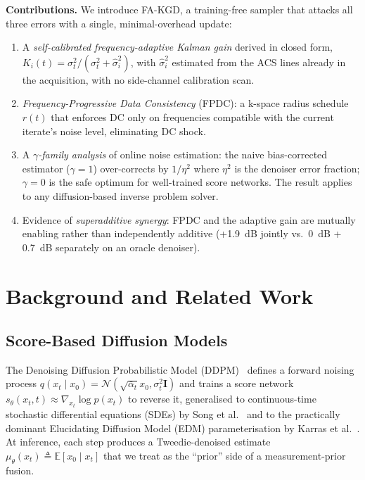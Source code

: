 \documentclass[conference]{IEEEtran}
\newcommand{\hatsig}{\hat{\sigma}}
\newcommand{\muth}{\mu_\theta}
\begin{document}
\textbf{Contributions.} We introduce FA-KGD, a training-free sampler that
attacks all three errors with a single, minimal-overhead update:
\begin{enumerate}
  \item A \emph{self-calibrated frequency-adaptive Kalman gain} derived in
  closed form, $K_i(t)=\sigma_t^2/(\sigma_t^2+\hatsig_i^2)$, with $\hatsig_i^2$
  estimated from the ACS lines already in the acquisition, with no side-channel
  calibration scan.
  \item \emph{Frequency-Progressive Data Consistency} (FPDC): a k-space
  radius schedule $r(t)$ that enforces DC only on frequencies compatible with
  the current iterate's noise level, eliminating DC shock.
  \item A \emph{$\gamma$-family analysis} of online noise estimation: the
  naive bias-corrected estimator ($\gamma{=}1$) over-corrects by $1/\eta^2$
  where $\eta^2$ is the denoiser error fraction; $\gamma{=}0$ is the safe
  optimum for well-trained score networks. The result applies to any
  diffusion-based inverse problem solver.
  \item Evidence of \emph{superadditive synergy}: FPDC and the adaptive gain
  are mutually enabling rather than independently additive (+1.9~dB jointly
  vs.~0~dB + 0.7~dB separately on an oracle denoiser).
\end{enumerate}

\section{Background and Related Work}
\label{sec:related}

\subsection{Score-Based Diffusion Models}

The Denoising Diffusion Probabilistic Model (DDPM)~\cite{ho2020ddpm} defines
a forward noising process
$q(x_t \mid x_0)\!=\!\mathcal{N}(\sqrt{\bar{\alpha}_t} x_0, \sigma_t^2
\mathbf{I})$ and trains a score network $s_\theta(x_t, t)\!\approx\!
\nabla_{x_t} \log p(x_t)$ to reverse it, generalised to continuous-time
stochastic differential equations (SDEs) by Song et al.~\cite{song2021score}
and to the practically dominant Elucidating Diffusion Model (EDM)
parameterisation by Karras et al.~\cite{karras2022edm}. At inference, each
step produces a Tweedie-denoised estimate
$\muth(x_t) \!\triangleq\!\mathbb{E}[x_0\mid x_t]$ that we treat as the ``prior''
side of a measurement-prior fusion.
\end{document}
